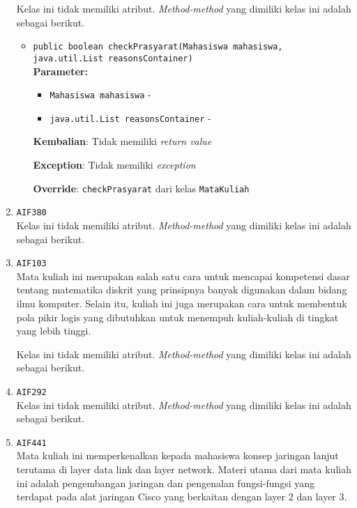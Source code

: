 \documentclass{article}
\begin{document}
\begin{enumerate}
Kelas ini tidak memiliki atribut. \textit{Method-method} yang dimiliki kelas ini adalah sebagai berikut.
\begin{itemize}
\item \texttt{public boolean checkPrasyarat(Mahasiswa mahasiswa, java.util.List reasonsContainer)}\\ 


\textbf{Parameter:}\begin{itemize}
\item \texttt{Mahasiswa mahasiswa} - 
\item \texttt{java.util.List reasonsContainer} - 
\end{itemize}
\textbf{Kembalian}: Tidak memiliki \textit{return value}

\textbf{Exception}: Tidak memiliki \textit{exception}

\textbf{Override}: \texttt{checkPrasyarat} dari kelas \texttt{MataKuliah}

\end{itemize}
\item \texttt{AIF380}\\ 
Kelas ini tidak memiliki atribut. \textit{Method-method} yang dimiliki kelas ini adalah sebagai berikut.
\begin{itemize}
\end{itemize}
\item \texttt{AIF103}\\ 
Mata kuliah ini merupakan salah satu cara untuk mencapai kompetensi dasar 
 tentang matematika diskrit yang prinsipnya banyak digunakan dalam bidang 
 ilmu komputer. Selain itu, kuliah ini juga merupakan cara untuk membentuk 
 pola pikir logis yang dibutuhkan untuk menempuh kuliah-kuliah di tingkat 
 yang lebih tinggi.

Kelas ini tidak memiliki atribut. \textit{Method-method} yang dimiliki kelas ini adalah sebagai berikut.
\begin{itemize}
\end{itemize}
\item \texttt{AIF292}\\ 
Kelas ini tidak memiliki atribut. \textit{Method-method} yang dimiliki kelas ini adalah sebagai berikut.
\begin{itemize}
\end{itemize}
\item \texttt{AIF441}\\ 
Mata kuliah ini memperkenalkan kepada mahasiswa konsep jaringan lanjut
 terutama di layer data link dan layer network. Materi utama dari mata kuliah
 ini adalah pengembangan jaringan dan pengenalan fungsi-fungsi yang terdapat
 pada alat jaringan Cisco yang berkaitan dengan layer 2 dan layer 3.


\end{enumerate}
\end{document}
